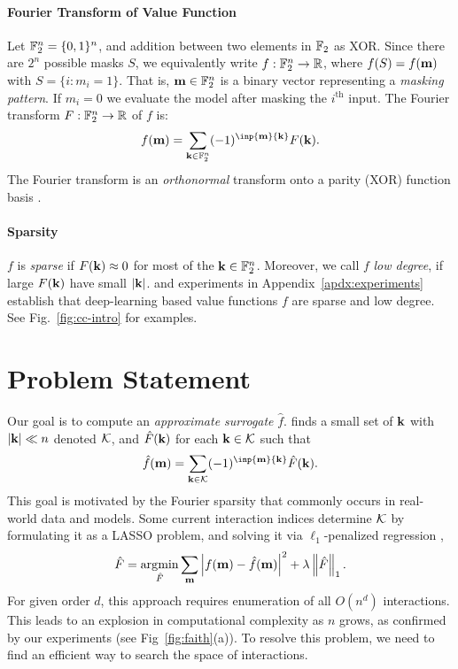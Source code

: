 \vspace{-7pt}
\paragraph{Fourier Transform of Value Function} Let $\mathbb F_2^n = \{0,1\}^n$, and addition between two elements in $\mathbb F_2$ as XOR. Since there are $2^n$ possible masks $S$, we equivalently write $f : \mathbb F_2^n \rightarrow \mathbb R$, where $f(S) = f(\mathbf m)$ with $S = \{ i : m_i = 1\}$. 
%
That is, $\mathbf m \in \mathbb F_2^n$ is a binary vector representing a \emph{masking pattern}. 
%
If $m_i = 0$ we evaluate the model after masking the $i^{\text{th}}$ input. 
%
The Fourier transform $F : \mathbb F_2^n \rightarrow \mathbb R$ of $f$ is:
\begin{equation}\label{eq:transform}
    f(\bbm)  = \sum_{\bk \in \bbF_2^n} (-1)^{\inp{\bbm}{\bk}} F(\bk).
\end{equation}
The Fourier transform is an \emph{orthonormal} transform onto a parity (XOR) function basis \cite{odonnell2014analysis}.


\paragraph{Sparsity} 
$f$ is \emph{sparse} if $F(\mathbf k) \approx 0$ for most of the $\mathbf k \in \mathbb F_2^n$. Moreover, we call $f$ \emph{low degree}, if large $F(\mathbf k)$ have small $\left\lvert \mathbf k \right\rvert$.
\citet{ren2024towards, kang2024learning, valle2018deep, yang2019fine} and experiments in Appendix~\ref{apdx:experiments} establish that deep-learning based value functions $f$ are sparse and low degree. 
%
See Fig.~\ref{fig:cc-intro} for examples. 
%


\vspace{-7pt}
\section{Problem Statement} 

Our goal is to compute an \textit{approximate surrogate} $\hat{f}$. 
%
\SpecExp{}  finds a small set of $\mathbf k$ with $\left\lvert \mathbf k \right\rvert \ll n$ denoted $\mathcal K$, and $\hat{F}(\mathbf k)$ for each $\mathbf k \in \mathcal K$ such that
\begin{equation}\label{eq:surrogate}
    \hat{f}(\bbm) = \sum_{\bk \in \cK} (-1)^{\inp{\bbm}{\bk}} \hat{F}(\bk). 
\end{equation}
%
This goal is motivated by the Fourier sparsity that commonly occurs in real-world data and models.
%
Some current interaction indices \cite{tsai2023faith} determine $\mathcal K$ by formulating it as a LASSO problem, and solving it via $\ell_1$-penalized regression \cite{tibshirani1996regression},
\begin{equation}
    \hat{F} = \operatorname*{\arg\!\min}_{\hat{F}} \sum_{\mathbf m} \left\lvert f(\mathbf m) - \hat{f}(\mathbf m) \right\rvert^2 + \lambda \left\lVert\hat{F}\right\rVert_1.
\end{equation}
For given order $d$, this approach requires enumeration of all $O(n^{d})$ interactions. 
%
This leads to an explosion in computational complexity as $n$ grows, as confirmed by our experiments (see Fig~\ref{fig:faith}(a)). 
%
To resolve this problem, we need to find an efficient way to search the space of interactions.


